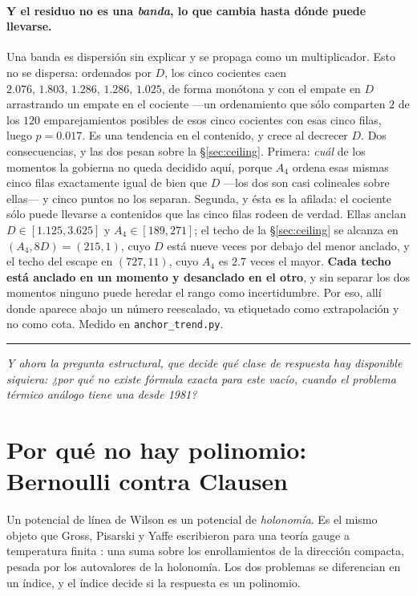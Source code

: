\documentclass[11pt,a4paper]{article}
\newcommand{\bridge}[1]{\par\medskip\noindent
  \textcolor{hdrblue!45}{\rule{2.2cm}{0.6pt}}\;\;\parbox[t]{0.84\textwidth}{\small\itshape
  \textcolor{hdrblue!85}{#1}}\par\medskip}
\begin{document}
\paragraph{Y el residuo no es una \emph{banda}, lo que cambia hasta dónde puede llevarse.} Una banda es dispersión sin
explicar y se propaga como un multiplicador. Esto no se dispersa: ordenados por $D$, los cinco
cocientes caen $2.076,\,1.803,\,1.286,\,1.286,\,1.025$, de forma monótona y con el empate en $D$
arrastrando un empate en el cociente ---un ordenamiento que sólo comparten $2$ de los $120$
emparejamientos posibles de esos cinco cocientes con esas cinco filas, luego $p=0.017$. Es una
tendencia en el contenido, y crece al decrecer $D$. Dos consecuencias, y las dos pesan sobre la
\S\ref{sec:ceiling}. Primera: \emph{cuál} de los momentos la gobierna no queda decidido aquí, porque
$A_4$ ordena esas mismas cinco filas exactamente igual de bien que $D$ ---los dos son casi
colineales sobre ellas--- y cinco puntos no los separan. Segunda, y ésta es la afilada: el cociente
sólo puede llevarse a contenidos que las cinco filas rodeen de verdad. Ellas anclan
$D\in[1.125,3.625]$ y $A_4\in[189,271]$; el techo de la \S\ref{sec:ceiling} se alcanza en
$(A_4,8D)=(215,1)$, cuyo $D$ está nueve veces por debajo del menor anclado, y el techo del escape en
$(727,11)$, cuyo $A_4$ es $2.7$ veces el mayor. \textbf{Cada techo está anclado en un momento y
desanclado en el otro}, y sin separar los dos momentos ninguno puede heredar el rango como
incertidumbre. Por eso, allí donde aparece abajo un número reescalado, va etiquetado como
extrapolación y no como cota. Medido en \texttt{anchor\_trend.py}.

\bridge{Y ahora la pregunta estructural, que decide qué clase de respuesta hay disponible siquiera:
¿por qué no existe fórmula exacta para este vacío, cuando el problema térmico análogo tiene una
desde 1981?}

\section{Por qué no hay polinomio: Bernoulli contra Clausen}\label{sec:parity}

Un potencial de línea de Wilson es un potencial de \emph{holonomía}. Es el mismo objeto que Gross,
Pisarski y Yaffe escribieron para una teoría gauge a temperatura finita \cite{GPY}: una suma sobre
los enrollamientos de la dirección compacta, pesada por los autovalores de la holonomía. Los dos
problemas se diferencian en un índice, y el índice decide si la respuesta es un polinomio.
\end{document}
